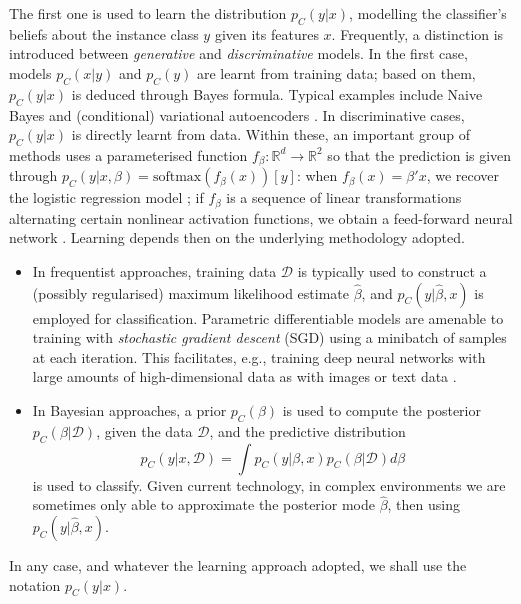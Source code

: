 The first one is used to learn the distribution $p_C(y|x)$, modelling the classifier's beliefs about the  instance class $y$ given its features $x$. 
Frequently, a distinction is introduced 
between {\em generative} and {\em discriminative} models. %
   In the first case, models $p_C(x|y)$ and $p_C (y)$ are learnt from training data; based on them,
$p_C(y|x)$ is deduced through Bayes formula. Typical examples include 
Naive Bayes \parencite{rish2001empirical} and (conditional) variational autoencoders %
 \parencite{kingma2014semi}.
%
In discriminative cases, $p_C(y|x)$ is directly learnt from data.
Within these, an important group of methods uses  
a parameterised function
$f_\beta : \mathbb{R}^d \rightarrow \mathbb{R}^2 $
so that the prediction is given through 
$p_C(y|x,\beta) = \mbox{softmax} (f_\beta (x))[y]$: when $f_\beta (x) = \beta' x$, we recover the logistic regression
model 
\parencite{mccullagh1989generalized}; 
if $f_\beta$ is  a sequence of linear transformations alternating certain nonlinear activation functions,   %
 we obtain a feed-forward neural network \parencite{bishop2006pattern}. 
 Learning depends then on the underlying
methodology adopted.
%
\begin{itemize}
\item In frequentist approaches, training data $\mathcal{D}$ is 
typically used to construct a (possibly regularised) maximum likelihood estimate $\hat{\beta}$, and $p_C(y | \hat{ \beta }, x )$ is employed for classification. Parametric
differentiable models are amenable to training with \emph{stochastic gradient descent}
(SGD) \parencite{bottou2008tradeoffs}  %
using a minibatch %
of samples at each iteration. 
This facilitates, e.g.,  training 
deep neural networks with large amounts of
high-dimensional data as 
with images or text data \parencite{10.5555/3086952}.
\item In Bayesian approaches, a prior $p_C (\beta)$ is used to compute the posterior $p_C (\beta | \mathcal{D} )$, given the data $\mathcal{D}$, and the predictive distribution
\begin{equation}\label{MIERDA}
p_C (y | x, \mathcal{D})= \int p_C(y | \beta , x ) p_C (\beta | \mathcal{D} ) d\beta 
\end{equation} 
is used to classify. Given current technology,
in complex environments  
we are sometimes only able to approximate the posterior mode $\hat {\beta}$,
then using $p_C(y | \hat {\beta} , x )$.
\end{itemize}
In any case, and whatever the learning approach adopted, we shall use the notation $p_C (y |x)$. 


